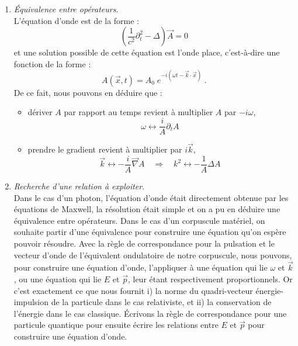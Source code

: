 \documentclass[12pt, a4paper]{book}
\begin{document}
\begin{enumerate}[label =  (\alph*)]
\item \textit{Équivalence entre opérateurs}. \\
L'équation d'onde est de la forme : 
$$\left(\dfrac{1}{c^2} \partial_t ^2 - \Delta \right) \vec A = 0$$
et une solution possible de cette équation est l'onde place, c'est-à-dire une fonction de la forme : $$
A(\vec{x}, t) = A_0 \; e^{-i(\omega t - \vec k \cdot \vec x)} \; .$$
De ce fait, nous pouvons en déduire que : 
\begin{itemize}
\item dériver $A$ par rapport au temps revient à multiplier $A$ par $-i\omega$,
\begin{equation}
\label{équivalence pulsation}
  \boxed{\omega \longleftrightarrow \dfrac{i}{A} \partial_t A} \; 
\end{equation}
\item prendre le gradient revient à multiplier par $i\vec k$, 
\begin{equation}
\label{equivalence nombre d'onde}
  \vec k \longleftrightarrow -\dfrac{i}{A} \vec \nabla A \quad \Rightarrow \quad \boxed{k^2 \longleftrightarrow -\dfrac{1}{A} \Delta A} \; 
\end{equation}
\end{itemize}

\item \textit{Recherche d'une relation à exploiter}. \\
Dans le cas d'un photon, l'équation d'onde était directement obtenue par les équations de Maxwell, la résolution était simple et on a pu en déduire une équivalence entre opérateurs. Dans le cas d'un corpuscule matériel, on souhaite partir d'une équivalence pour construire une équation qu'on espère pouvoir résoudre. Avec la règle de correspondance pour la pulsation et le vecteur d'onde de l'équivalent ondulatoire de notre corpuscule, nous pouvons, pour construire une équation d'onde, l'appliquer à une équation qui lie $\omega$ et $\vec k$, ou une équation qui lie $E$ et $\vec p$, leur étant respectivement proportionnels. Or c'est exactement ce que nous fournit i) la norme du quadri-vecteur énergie-impulsion de la particule dans le cas relativiste, et ii) la conservation de l'énergie dans le cas classique. Écrivons la règle de correspondance pour une particule quantique pour ensuite écrire les relations entre $E$ et $\vec p$ pour construire une équation d'onde.


\end{enumerate}
\end{document}
